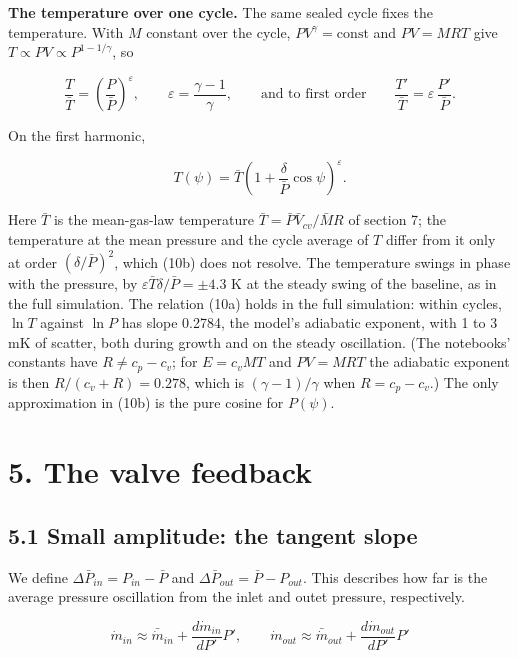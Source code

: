 \documentclass[11pt]{article}
\begin{document}
\textbf{The temperature over one cycle.} The same sealed cycle fixes the temperature. With $M$ constant over the cycle, $PV^{\gamma} = \mathrm{const}$ and $PV = MRT$ give $T \propto PV \propto P^{1-1/\gamma}$, so

\begin{equation}
\frac{T}{\bar T} = \left(\frac{P}{\bar P}\right)^{\varepsilon}, \qquad \varepsilon = \frac{\gamma-1}{\gamma}, \qquad\text{and to first order}\qquad \frac{T'}{\bar T} = \varepsilon\,\frac{P'}{\bar P} . \tag{10a}
\end{equation}

On the first harmonic,

\begin{equation}
T(\psi) = \bar T\left(1 + \frac{\delta}{\bar P}\cos\psi\right)^{\varepsilon} . \tag{10b}
\end{equation}

Here $\bar T$ is the mean-gas-law temperature $\bar T = \bar P\bar V_{cv}/\bar MR$ of section 7; the temperature at the mean pressure and the cycle average of $T$ differ from it only at order $(\delta/\bar P)^2$, which (10b) does not resolve. The temperature swings in phase with the pressure, by $\varepsilon\bar T\delta/\bar P = \pm 4.3$ K at the steady swing of the baseline, as in the full simulation. The relation (10a) holds in the full simulation: within cycles, $\ln T$ against $\ln P$ has slope 0.2784, the model's adiabatic exponent, with 1 to 3 mK of scatter, both during growth and on the steady oscillation. (The notebooks' constants have $R \ne c_p - c_v$; for $E = c_vMT$ and $PV = MRT$ the adiabatic exponent is then $R/(c_v + R) = 0.278$, which is $(\gamma - 1)/\gamma$ when $R = c_p - c_v$.) The only approximation in (10b) is the pure cosine for $P(\psi)$.

\section*{5. The valve feedback}

\subsection*{5.1 Small amplitude: the tangent slope}

We define $\Delta\bar P_{in} = P_{in} - \bar P$ and $\Delta\bar P_{out} = \bar P - P_{out}$. This describes how far is the average pressure oscillation from the inlet and outet pressure, respectively.

\begin{equation}
\dot{m}_{in} \approx \bar {\dot{m}}_{in} + \frac{d\dot{m}_{in}}{dP'}P', \qquad \dot{m}_{out} \approx \bar {\dot{m}}_{out} + \frac{d\dot{m}_{out}}{dP'}P' \tag{13}
\end{equation}
\end{document}
